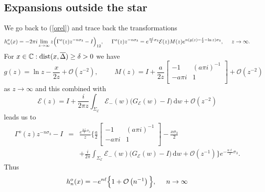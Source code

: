 \documentclass[10pt,oneside,reqno]{amsart}
\numberwithin{equation}{section}
\renewcommand{\d}{{\mathrm d}}
\def\eqref#1{(\ref{#1})}
\begin{document}
\subsection{Expansions outside the star} We go back to \eqref{orel} and trace back the transformations
\begin{equation*}
  h_n^o(x)=-2\pi i\lim_{z\rightarrow\infty}z\Big(\Gamma^o(z)z^{-n\sigma_3}-I\Big)_{12},\hspace{0.5cm}\Gamma^o(z)z^{-n\sigma_3}
 = e^{\frac{n\ell}{2}\sigma_3}{\mathcal E}(z)M(z)e^{n(g(z)-\frac{\ell}{2}-\ln z)\sigma_3},\hspace{0.5cm}z\rightarrow\infty.
\end{equation*}
For $x\in\mathbb{C}:\textnormal{dist}(x,\overline{\Delta})\geq\delta>0$ we have
\begin{equation*}
 g(z) =\ln z-\frac{x}{2z}+\mathcal O\left(z^{-2}\right),\hspace{1cm}
  M(z)=I+\frac{a}{2z}\begin{bmatrix}
                                   -1 & (a\pi i)^{-1}\\
-a\pi i& 1\\
                                  \end{bmatrix}+\mathcal O\left(z^{-2}\right)
\end{equation*}
as $z\rightarrow\infty$ and this combined with
\begin{equation*}
  {\mathcal E}(z)=I+\frac{i}{2\pi z}\int_{\Sigma_{\mathcal E}}{\mathcal E}_-(w)\big(G_{\mathcal E}(w)-I\big)\,\d w+\mathcal O\left(z^{-2}\right)
\end{equation*}
leads us to
\begin{eqnarray*}
  \Gamma^o(z)z^{-n\sigma_3}-I &=& \frac{e^{\frac{n\ell}{2}\sigma_3}}{z}\Bigg\{\frac{a}{2}\begin{bmatrix}
                                   -1 & (a\pi i)^{-1}\\
-a\pi i& 1\\
                                  \end{bmatrix}-\frac{x\sigma_3}{2}\\
&&+\frac{i}{2\pi}\int_{\Sigma_{\mathcal E}}{\mathcal E}_-(w)\big(G_{\mathcal E}(w)-I\big)\,\d w+\mathcal O\left(z^{-1}\right)\Bigg\}
e^{-\frac{n\ell}{2}\sigma_3}.
\end{eqnarray*}
Thus
\begin{equation}\label{hnexp1}
  h_n^o(x) = -e^{n\ell}\Big\{1+\mathcal O\left(n^{-1}\right)\Big\},\hspace{0.5cm}n\rightarrow\infty
\end{equation}
\end{document}
